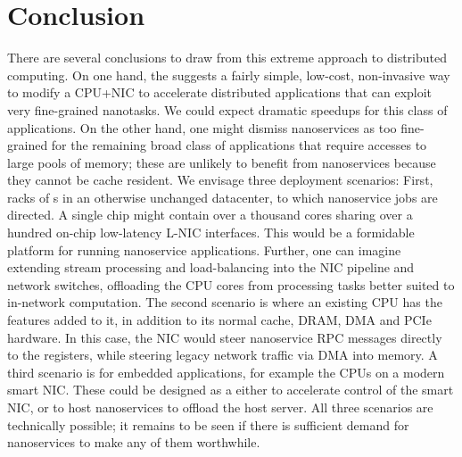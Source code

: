 \section{Conclusion}
There are several conclusions to draw from this extreme approach to distributed computing. On one hand, the \name{} suggests a fairly simple, low-cost, non-invasive way to modify a CPU+NIC to accelerate distributed applications that can exploit very fine-grained nanotasks. We could expect dramatic speedups for this class of applications. On the other hand, one might dismiss nanoservices as too fine-grained for the remaining broad class of applications that require accesses to large pools of memory; these are unlikely to benefit from nanoservices because they cannot be cache resident. We envisage three deployment scenarios: First, racks of \name{}s in an otherwise unchanged datacenter, to which nanoservice jobs are directed. A single chip might contain over a thousand \name{} cores sharing over a hundred on-chip low-latency L-NIC interfaces. This would be a formidable platform for running nanoservice applications. Further, one can imagine extending stream processing and load-balancing into the NIC pipeline and network switches, offloading the CPU cores from processing tasks better suited to in-network computation. The second scenario is where an existing CPU has the \name{} features added to it, in addition to its normal cache, DRAM, DMA and PCIe hardware. In this case, the NIC would steer nanoservice RPC messages directly to the registers, while steering legacy network traffic via DMA into memory. A third scenario is for embedded applications, for example the CPUs on a modern smart NIC. These could be designed as a \name{} either to accelerate control of the smart NIC, or to host nanoservices to offload the host server. All three scenarios are technically possible; it remains to be seen if there is sufficient demand for nanoservices to make any of them worthwhile. 

